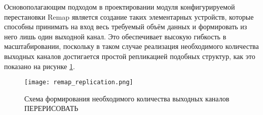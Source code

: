 Основополагающим подходом в проектировании модуля конфигурируемой перестановки Remap является создание таких элементарных устройств, которые способны принимать на вход весь требуемый объём данных и формировать из него лишь один выходной канал. Это обеспечивает высокую гибкость в масштабировании, поскольку в таком случае реализация необходимого количества выходных каналов достигается простой репликацией подобных структур, как это показано на рисунке \ref{fig:remap_replication}.\par

\begin{figure}[ht]
    \centering
    \texttt{[image: remap\_replication.png]}
    \caption{Схема формирования необходимого количества выходных каналов ПЕРЕРИСОВАТЬ}
    \label{fig:remap_replication}
\end{figure}\par

